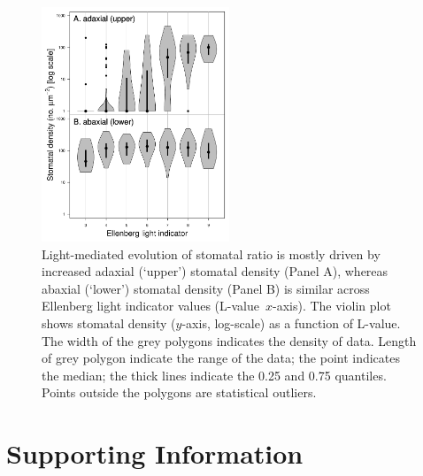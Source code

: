 \documentclass[12pt, oneside]{article}
\newcommand{\el}{L-value}
\begin{document}
\begin{figure}[ht]
\centerline{\includegraphics[width=0.5\textwidth]{figures/figure_SD-light.pdf}}
\caption{Light-mediated evolution of stomatal ratio is mostly driven by increased adaxial (`upper') stomatal density (Panel A), whereas abaxial (`lower') stomatal density (Panel B) is similar across Ellenberg light indicator values (\el~$x$-axis). The violin plot shows stomatal density ($y$-axis, log-scale) as a function of \el. The width of the grey polygons indicates the density of data. Length of grey polygon indicate the range of the data; the point indicates the median; the thick lines indicate the 0.25 and 0.75 quantiles. Points outside the polygons are statistical outliers.} 
\label{fig:SD-light}
\end{figure}

\clearpage


\section*{Supporting Information}

\renewcommand\thefigure{S\arabic{figure}}    
\renewcommand\thetable{S\arabic{table}}    
\renewcommand\theequation{S\arabic{equation}}    
\setcounter{table}{0}    
\setcounter{equation}{0}
\setcounter{figure}{0}

\end{document}

